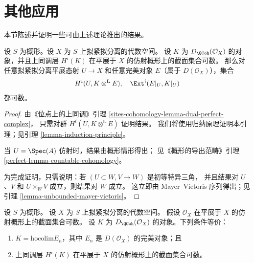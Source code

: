 \section{其他应用}
\label{section-other-applications}

\noindent
本节陈述并证明一些可由上述理论推出的结果。

\begin{lemma}
\label{lemma-countable-cohomology}
设 $S$ 为概形。设 $X$ 为 $S$ 上拟紧拟分离的代数空间。
设 $K$ 为 $D_\QCoh(\mathcal{O}_X)$ 的对象，并且上同调层
$H^i(K)$ 在平展于 $X$ 的仿射概形上的截面集合可数。
那么对任意拟紧拟分离平展态射 $U \to X$ 和任意完美对象
$E$（属于 $D(\mathcal{O}_X)$），集合
$$
H^i(U, K \otimes^\mathbf{L} E),\quad \Ext^i(E|_U, K|_U)
$$
都可数。
\end{lemma}

\begin{proof}
由《位点上的上同调》引理
\ref{sites-cohomology-lemma-dual-perfect-complex}，
只需对群 $H^i(U, K \otimes^\mathbf{L} E)$ 证明结果。
我们将使用归纳原理证明本引理；见引理
\ref{lemma-induction-principle}。

\medskip\noindent
当 $U = \Spec(A)$ 仿射时，结果由概形情形得出；
见《概形的导出范畴》引理
\ref{perfect-lemma-countable-cohomology}。

\medskip\noindent
为完成证明，只需说明：若 $(U \subset W, V \to W)$
是初等特异三角，%
并且结果对 $U$、$V$ 和 $U \times_W V$ 成立，则结果对 $W$ 成立。
这立即由 Mayer--Vietoris 序列得出；见引理
\ref{lemma-unbounded-mayer-vietoris}。
\end{proof}

\begin{lemma}
\label{lemma-countable}
设 $S$ 为概形。
设 $X$ 为 $S$ 上拟紧拟分离的代数空间。
假设 $\mathcal{O}_X$ 在平展于 $X$ 的仿射概形上的截面集合可数。
设 $K$ 为 $D_\QCoh(\mathcal{O}_X)$ 的对象。下列条件等价：
\begin{enumerate}
\item $K = \text{hocolim} E_n$，其中 $E_n$ 是
$D(\mathcal{O}_X)$ 的完美对象；且
\item 上同调层 $H^i(K)$ 在平展于 $X$ 的仿射概形上的截面集合可数。
\end{enumerate}
\end{lemma}

